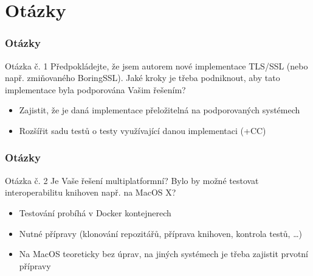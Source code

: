 \documentclass[10pt,xcolor=pdflatex]{beamer}
\begin{document}



\section{Otázky}

\begin{frame}
\frametitle{Otázky}
\begin{block}{Otázka č. 1}
Předpokládejte, že jsem autorem nové implementace TLS/SSL (nebo např. zmiňovaného BoringSSL). Jaké kroky je třeba podniknout, aby tato implementace byla podporována Vašim řešením?
\end{block}

\begin{itemize}
    \item Zajistit, že je daná implementace přeložitelná na podporovaných systémech
    \item Rozšířit sadu testů o testy využívající danou implementaci (+CC)
\end{itemize}
\end{frame}

\begin{frame}
\frametitle{Otázky}
\begin{block}{Otázka č. 2}
Je Vaše řešení multiplatformní? Bylo by možné testovat interoperabilitu knihoven např. na MacOS X?
\end{block}

\begin{itemize}
    \item Testování probíhá v Docker kontejnerech
    \item Nutné přípravy (klonování repozitářů, příprava knihoven, kontrola testů, \dots)
    \item Na MacOS teoreticky bez úprav, na jiných systémech je třeba zajistit prvotní přípravy
\end{itemize}
\end{frame}
\end{document}
